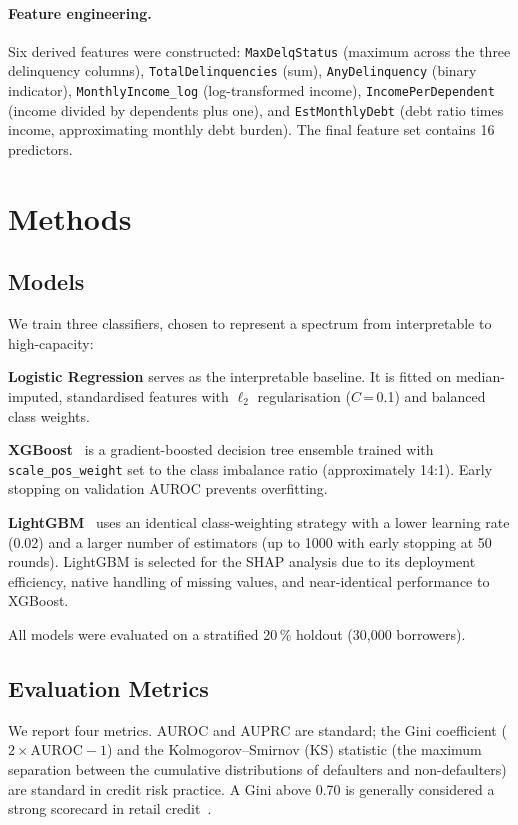 \documentclass[11pt]{article}
\begin{document}
\paragraph{Feature engineering.} Six derived features were constructed:
\texttt{MaxDelqStatus} (maximum across the three delinquency columns),
\texttt{TotalDelinquencies} (sum), \texttt{AnyDelinquency} (binary indicator),
\texttt{MonthlyIncome\_log} (log-transformed income),
\texttt{IncomePerDependent} (income divided by dependents plus one),
and \texttt{EstMonthlyDebt} (debt ratio times income, approximating
monthly debt burden). The final feature set contains 16 predictors.

\section{Methods}

\subsection{Models}

We train three classifiers, chosen to represent a spectrum from interpretable
to high-capacity:

\noindent\textbf{Logistic Regression} serves as the interpretable baseline. It
is fitted on median-imputed, standardised features with $\ell_2$ regularisation
(${C}$\,=\,0.1) and balanced class weights.

\noindent\textbf{XGBoost}~\cite{chen2016xgboost} is a gradient-boosted
decision tree ensemble trained with \texttt{scale\_pos\_weight} set to the
class imbalance ratio (approximately 14:1). Early stopping on validation AUROC
prevents overfitting.

\noindent\textbf{LightGBM}~\cite{ke2017lightgbm} uses an identical class-weighting
strategy with a lower learning rate (0.02) and a larger number of estimators
(up to 1000 with early stopping at 50 rounds). LightGBM is selected for the
SHAP analysis due to its deployment efficiency, native handling of missing
values, and near-identical performance to XGBoost.

All models were evaluated on a stratified 20\,\% holdout (30,000 borrowers).

\subsection{Evaluation Metrics}

We report four metrics. AUROC and AUPRC are standard; the Gini coefficient
($2 \times \text{AUROC} - 1$) and the Kolmogorov--Smirnov (KS) statistic
(the maximum separation between the cumulative distributions of defaulters and
non-defaulters) are standard in credit risk practice. A Gini above 0.70 is
generally considered a strong scorecard in retail credit~\cite{siddiqi2012credit}.
\end{document}
